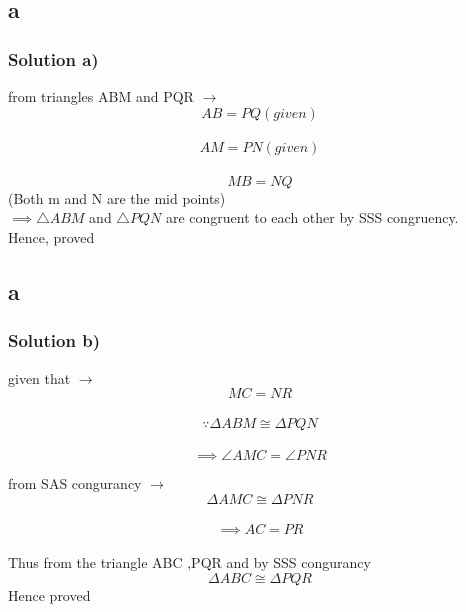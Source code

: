 \documentclass{beamer}
\begin{document}
\subsection{a}
\begin{frame}
\frametitle{Solution a)}
\footnotesize
\label{a}
from triangles ABM and PQR $\to$
\\
$$AB=PQ(given)$$
\\
$$AM=PN(given)$$
\\
$$MB =NQ$$(Both m and N are the mid points)
\newline
\\
$\implies \triangle ABM$ and $\triangle PQN$ are congruent to each other by SSS congruency.
\\
Hence, proved
\end{frame}

\subsection{a}
\begin{frame}
	\frametitle{Solution b)}
	\footnotesize
	\label{b}
		given that $\to$
	\\
	$$MC = NR$$ 
	\\
	$$\because \Delta ABM \cong \Delta PQN $$
	\\
	$$\implies \angle AMC = \angle PNR$$
	
	from SAS congurancy $ \to$
	\\
	$$\Delta AMC \cong \Delta PNR$$
	\\
	$$\implies AC = PR$$
	\\
	Thus from the triangle ABC ,PQR and by SSS congurancy 
	$$\Delta ABC \cong \Delta PQR$$
	\centering Hence proved
\end{frame}
\end{document}
